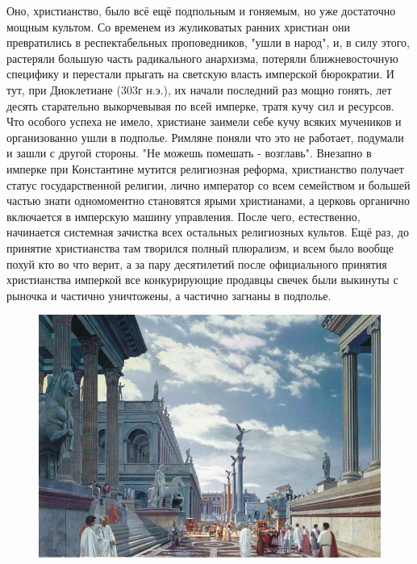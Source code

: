Оно, христианство, было всё ещё подпольным и гоняемым, но уже достаточно мощным культом. Со временем из жуликоватых ранних христиан они превратились в респектабельных проповедников, "ушли в народ", и, в силу этого, растеряли большую часть радикального анархизма, потеряли ближневосточную специфику и перестали прыгать на светскую власть имперской бюрократии. И тут, при Диоклетиане (303г н.э.), их начали последний раз мощно гонять, лет десять старательно выкорчевывая по всей имперке, тратя кучу сил и ресурсов. Что особого успеха не имело, христиане заимели себе кучу всяких мучеников и организованно ушли в подполье. Римляне поняли что это не работает, подумали и зашли с другой стороны. "Не можешь помешать - возглавь". Внезапно в имперке при Константине мутится религиозная реформа, христианство получает статус государственной религии, лично император со всем семейством и большей частью знати одномоментно становятся ярыми христианами, а церковь органично включается в имперскую машину управления. После чего, естественно, начинается системная зачистка всех остальных религиозных культов. Ещё раз, до принятие христианства там творился полный плюрализм, и всем было вообще похуй кто во что верит, а за пару десятилетий после официального принятия христианства имперкой все конкурирующие продавцы свечек были выкинуты с рыночка и частично уничтожены, а частично загнаны в подполье. 
\begin{figure}[h!tb]
	\centering\includegraphics[scale=0.5]{Relig_gambit/1572932193123151938.png}
	\label{fig:gambit4} %
	
\end{figure}

